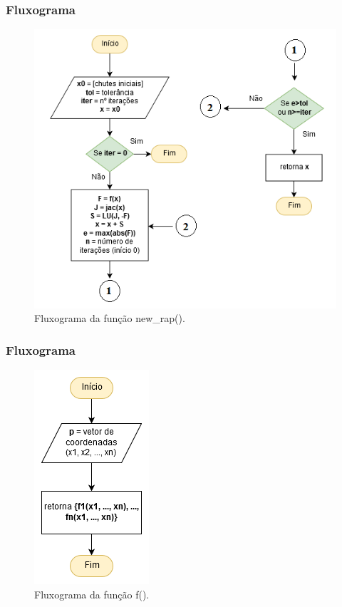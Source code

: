 \documentclass[aspectratio=1610]{beamer}
\begin{document}

\begin{frame}
\frametitle{Fluxograma}


\begin{figure}
  \centering
  \includegraphics[scale=0.6]{Imagens/diag_new1.png}
  \caption{Fluxograma da função new\_rap().}
\end{figure}


\end{frame}


\begin{frame}
\frametitle{Fluxograma}


\begin{figure}
  \centering
  \includegraphics[scale=0.6]{Imagens/diag_func.png}
  \caption{Fluxograma da função f().}
\end{figure}


\end{frame}
\end{document}

